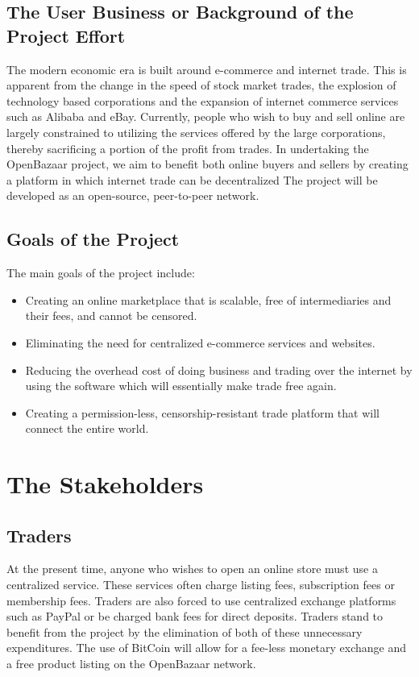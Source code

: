 \documentclass{article}
\begin{document}
\subsection{The User Business or Background of the Project Effort}
The modern economic era is built around e-commerce and internet trade. This is apparent from the change in the speed of stock market trades, the explosion of technology based corporations and the expansion of internet commerce services such as Alibaba and eBay.
Currently, people who wish to buy and sell online are largely constrained to utilizing the services offered by the large corporations, thereby sacrificing a portion of the profit from trades. In undertaking the OpenBazaar project, we aim to benefit both online buyers and sellers by creating a platform in which internet trade can be decentralized
The project will be developed as an open-source, peer-to-peer network. 
\subsection{Goals of the Project}
The main goals of the project include:
\begin{itemize}
\item
Creating an online marketplace that is scalable, free of intermediaries and their fees, and cannot be censored.
\item
Eliminating the need for centralized e-commerce services and websites.
\item
Reducing the overhead cost of doing business and trading over the internet by using the software which will essentially make trade free again.
\item
Creating a permission-less, censorship-resistant trade platform that will connect the entire world.
\end{itemize}
\section{The Stakeholders}
\subsection{Traders}
At the present time, anyone who wishes to open an online store must use a centralized service. These services often charge listing fees, subscription fees or membership fees. Traders are also forced to use centralized exchange platforms such as PayPal or be charged bank fees for direct deposits. Traders stand to benefit from the project by the elimination of both of these unnecessary expenditures. The use of BitCoin will allow for a fee-less monetary exchange and a free product listing on the OpenBazaar network.
\end{document}
